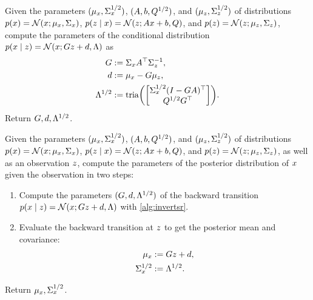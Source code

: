 \documentclass{mimosis}
\begin{document}
\begin{alg}
\algeqspacing
\label{alg:invert}
\label{alg:invertsr}
Given the parameters
\((\mu_{x}, \Sigma_{x}^{1/2})\),
\((A, b, Q^{1/2})\), and
\((\mu_{z}, \Sigma_{z}^{1/2})\)
of distributions
\({\p( \st ) = \N( \st; \mean{\st}, \cov{\st} )}\),
\(\p( \obs \mid \st ) = \N( \obs; \transA \st + \transb, \transC )\),
and
\(\p( \obs ) = \N( \obs; \mean{\obs}, \cov{\obs} )\),
compute the parameters of the conditional distribution
\(\p(\st \mid \obs) = \N( \st; \invtransA \obs + \invtransb, \invtransC )\)
as
\begin{subequations}
\begin{align}
\invtransA &:= \cov{\st} \transA^\T \cov{\obs}^{-1}, \\
\invtransb &:= \mean{\st} - \invtransA \mean{\obs}, \\
\invtransC^{1/2} &:= \tria( \begin{bmatrix} \cov{\st}^{1/2} (I - \invtransA \transA)^\T \\ \transC^{1/2} \invtransA^\T \end{bmatrix}).
\end{align}
\end{subequations}
Return \(G, d, \Lambda^{1/2}\).
\end{alg}

\begin{alg}
\algeqspacing
\label{alg:update}
\label{alg:updatesr}
Given the parameters
\((\mu_{x}, \Sigma_{x}^{1/2})\),
\((A, b, Q^{1/2})\), and
\((\mu_{z}, \Sigma_{z}^{1/2})\)
of distributions
\({\p( \st ) = \N( \st; \mean{\st}, \cov{\st} )}\),
\(\p( \obs \mid \st ) = \N( \obs; \transA \st + \transb, \transC )\),
and
\(\p( \obs ) = \N( \obs; \mean{\obs}, \cov{\obs} )\),
as well as an observation \(z\),
compute the parameters of the posterior distribution of \(x\) given the observation in two steps:
\begin{enumerate}[nosep]
\item Compute the parameters \((G, d, \Lambda^{1/2})\) of the backward transition
\(\p(\st \mid \obs) = \N( \st; \invtransA \obs + \invtransb, \invtransC )\)
with
\cref{alg:invertsr}.
\item Evaluate the backward transition at \(z\) to get the posterior mean and covariance:
\begin{subequations}
\begin{align}
\mu_{x} &:= G z + d, \\
\Sigma_{x}^{1/2} &:= \Lambda^{1/2}.
\end{align}
\end{subequations}
\end{enumerate}
Return
\(\mu_{x}, \Sigma_{x}^{1/2}\).
\end{alg}
\end{document}
